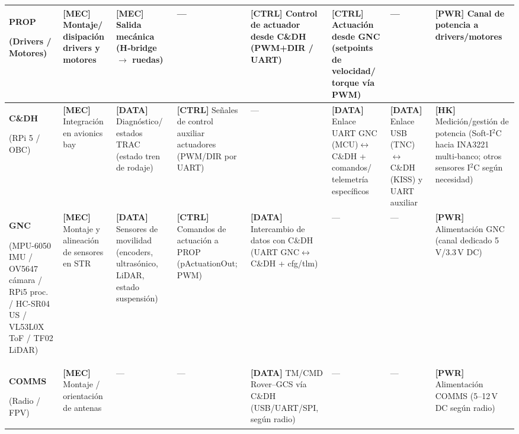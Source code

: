 \begin{landscape}
\begin{longtable}{|p{2.3cm}||p{2.9cm}|p{2.9cm}|p{2.9cm}|p{2.9cm}|p{2.9cm}|p{2.9cm}|p{2.9cm}|}
\textbf{PROP}\par(Drivers / Motores) & \textbf{[MEC]} Montaje/ disipación drivers y motores & \textbf{[MEC]} Salida mecánica (H‑bridge $\rightarrow$ ruedas) & --- & \textbf{[CTRL]} Control de actuador desde C\&DH (PWM+DIR / UART) & \textbf{[CTRL]} Actuación desde GNC (setpoints de velocidad/ torque vía PWM) & --- & \textbf{[PWR]} Canal de potencia a drivers/motores \\ \hline

\textbf{C\&DH}\par(RPi 5 / OBC) & \textbf{[MEC]} Integración en avionics bay & \textbf{[DATA]} Diagnóstico/ estados TRAC (estado tren de rodaje) & \textbf{[CTRL]} Señales de control auxiliar actuadores (PWM/DIR por UART) & --- & \textbf{[DATA]} Enlace UART GNC (MCU)$\leftrightarrow$C\&DH + comandos/ telemetría específicos & \textbf{[DATA]} Enlace USB (TNC)$\leftrightarrow$C\&DH (KISS) y UART auxiliar & \textbf{[HK]} Medición/gestión de potencia (Soft-I$^2$C hacia INA3221 multi-banco; otros sensores I$^2$C según necesidad) \\ \hline

\textbf{GNC}\par(MPU-6050 IMU / OV5647 cámara / RPi5 proc. / HC-SR04 US / VL53L0X ToF / TF02 LiDAR) & \textbf{[MEC]} Montaje y alineación de sensores en STR & \textbf{[DATA]} Sensores de movilidad (encoders, ultrasónico, LiDAR, estado suspensión) & \textbf{[CTRL]} Comandos de actuación a PROP (pActuationOut; PWM) & \textbf{[DATA]} Intercambio de datos con C\&DH (UART GNC$\leftrightarrow$C\&DH + cfg/tlm) & --- & --- & \textbf{[PWR]} Alimentación GNC (canal dedicado 5\,V/3.3\,V DC) \\ \hline

\textbf{COMMS}\par(Radio / FPV) & \textbf{[MEC]} Montaje / orientación de antenas & --- & --- & \textbf{[DATA]} TM/CMD Rover--GCS vía C\&DH (USB/UART/SPI, según radio) & --- & --- & \textbf{[PWR]} Alimentación COMMS (5--12\,V DC según radio) \\ \hline


\end{longtable}
\end{landscape}

